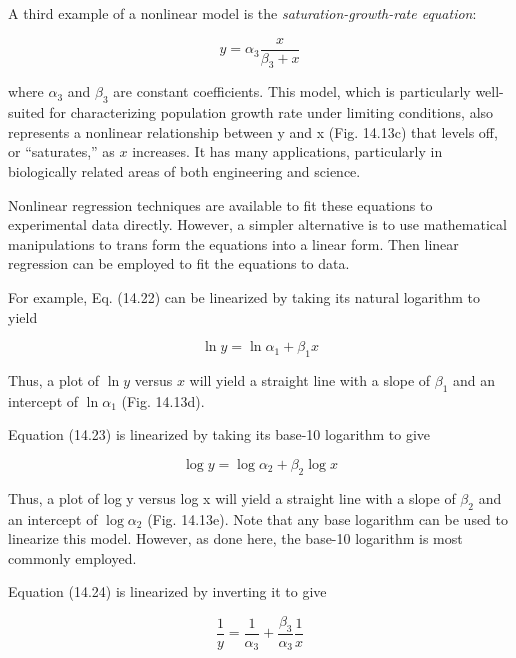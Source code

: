 \documentclass[../main.tex]{subfiles}
\begin{document}
A third example of a nonlinear model is the \textit{saturation-growth-rate equation}:

\begin{equation}
	\tag{14.24}
	y = \alpha_3 \frac{x}{\beta_3 + x}
\end{equation}

\noindent where $\alpha_3$ and $\beta_3$ are constant coefficients. This model, which is particularly well-suited for characterizing population growth rate under limiting conditions, also represents a nonlinear relationship between y and x (Fig. 14.13c) that levels off, or “saturates,” as $x$ increases. It has many applications, particularly in biologically related areas of both engineering and science.

Nonlinear regression techniques are available to fit these equations to experimental data directly. However, a simpler alternative is to use mathematical manipulations to trans form the equations into a linear form. Then linear regression can be employed to fit the equations to data.

For example, Eq. (14.22) can be linearized by taking its natural logarithm to yield

\begin{equation}
	\tag{14.25}
	\ln{y} = \ln{\alpha_1} + \beta_1 x
\end{equation}

\noindent Thus, a plot of $\ln{y}$ versus $x$ will yield a straight line with a slope of $\beta_1$ and an intercept of $\ln{\alpha_1}$ (Fig. 14.13d).

Equation (14.23) is linearized by taking its base-10 logarithm to give

\begin{equation} %
	\tag{14.26}
	\log y = \log \alpha_2 + \beta_2 \log x
\end{equation} 

\noindent Thus, a plot of log y versus log x will yield a straight line with a slope of $\beta_2$ and an intercept of $\log \alpha_2$ (Fig. 14.13e). Note that any base logarithm can be used to linearize this model. However, as done here, the base-10 logarithm is most commonly employed.

Equation (14.24) is linearized by inverting it to give

\begin{equation}
	\tag{14.27}
	\frac{1}{y} = \frac{1}{\alpha_3} + \frac{\beta_3}{\alpha_3} \frac{1}{x}
\end{equation}
\end{document}
